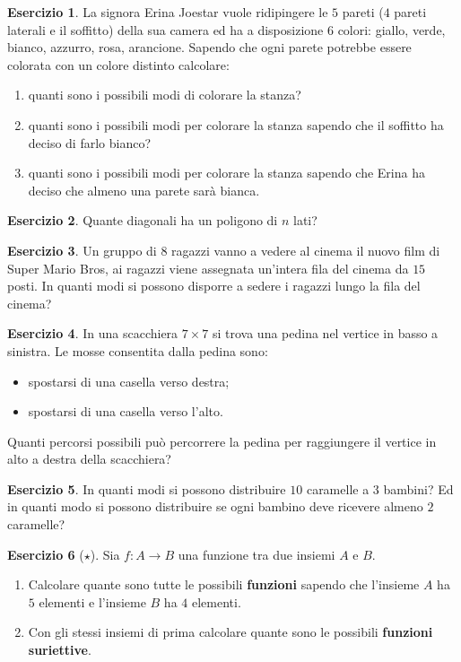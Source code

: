 \documentclass[12pt,a4paper]{article}
\theoremstyle{definition}
\newtheorem{exe}{Esercizio}
\begin{document}
\begin{exe}
	La signora Erina Joestar vuole ridipingere le $ 5 $ pareti ($ 4 $ pareti laterali e il soffitto) della sua camera ed ha a disposizione $ 6 $ colori: giallo, verde, bianco, azzurro, rosa, arancione. Sapendo che ogni parete potrebbe essere colorata con un colore distinto calcolare:
	\begin{enumerate}
		\item quanti sono i possibili modi di colorare la stanza?
		\item quanti sono i possibili modi per colorare la stanza sapendo che il soffitto ha deciso di farlo bianco?
		\item quanti sono i possibili modi per colorare la stanza sapendo che Erina ha deciso che almeno una parete sarà bianca.
	\end{enumerate}
\end{exe}

\begin{exe}
	Quante diagonali ha un poligono di $ n $ lati?
\end{exe}

\begin{exe}
	Un gruppo di $ 8 $ ragazzi vanno a vedere al cinema il nuovo film di Super Mario Bros, ai ragazzi viene assegnata un'intera fila del cinema da $ 15 $ posti. In quanti modi si possono disporre a sedere i ragazzi lungo la fila del cinema?
\end{exe}

\begin{exe}
	In una scacchiera $ 7 \times 7 $ si trova una pedina nel vertice in basso a sinistra. Le mosse consentita dalla pedina sono:
	\begin{itemize}
		\item spostarsi di una casella verso destra;
		\item  spostarsi di una casella verso l'alto.
	\end{itemize}
	Quanti percorsi possibili può percorrere la pedina per raggiungere il vertice in alto a destra della scacchiera?
\end{exe}

\begin{exe}
	In quanti modi si possono distribuire $ 10 $ caramelle a $ 3 $ bambini? Ed in quanti modo si possono distribuire se ogni bambino deve ricevere almeno $ 2 $ caramelle?
\end{exe}

\begin{exe}[$\star$]  Sia $ f:A \to B $ una funzione tra due insiemi $ A $ e $ B $.
	\begin{enumerate}
		\item Calcolare quante sono tutte le possibili \textbf{funzioni} sapendo che l'insieme $ A $ ha $ 5 $ elementi e l'insieme $ B $ ha $ 4 $ elementi.
		\item  Con gli stessi insiemi di prima calcolare quante sono le possibili \textbf{funzioni suriettive}.
	\end{enumerate}
\end{exe}
\end{document}
